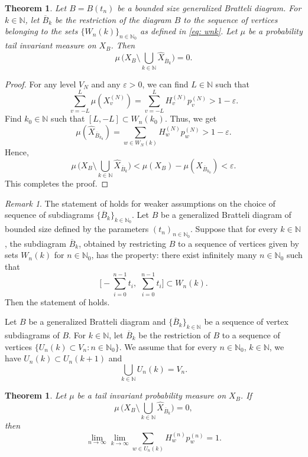 \documentclass[11pt,reqno]{amsart}
\theoremstyle{definition}
\theoremstyle{remark}
\newtheorem{remark}[definition]{Remark}
\theoremstyle{plain}
\newtheorem{theorem}[definition]{Theorem}
\def\ol{\overline}
\def\ov{\overline}
\def\wh{\widehat}
\newcommand{\N}{\mathbb N}
\numberwithin{equation}{section}
\begin{document}
\begin{theorem}\label{thm: muX_B_k} Let $B= B(t_n)$ be a bounded size generalized Bratteli diagram. For $k\in \N$, let $\ov{B}_k$ be the restriction of the diagram $B$ to the sequence of vertices belonging 
to the sets $\{W_n(k)\}_{n \in \N_0}$ as defined in \eqref{eq: wnk}. Let $\mu$ be a probability tail invariant measure on $X_B$. Then
 \[
 \mu \, \big(X_B \setminus \underset{k \in \N}{\bigcup} \wh{X}_{\ov{B}_k} \big) = 0.
\] 
 \end{theorem}

\begin{proof} 
For any level $V_N$ and any $\varepsilon> 0$, we can find $L\in \N$ such that 
 \[
 \sum_{v=-L}^{L} \mu(X_v^{(N)}) = \sum_{v=-L}^{L} H_v^{(N)}p_v^{(N)} > 1-\varepsilon.
 \] Find $k_0 \in \N$ such that $[L,-L] \subset W_n(k_0)$. Thus, we get
\[
\mu(\wh{X}_{\ov{B}_{k_0}}) = \underset{w \in W_N(k)}{\sum} H_w^{(N)}p_w^{(N)}  > 1-\varepsilon.
\]
Hence, 
\[
\mu \, \big(X_B \setminus \underset{k \in \N}{\bigcup} \wh{X}_{\ov{B}_k} \big) < \mu (X_B)  - \mu(\wh{X}_{\ov{B}_{k_0}})  < \varepsilon. 
\] 
This completes the proof.
\end{proof}

\begin{remark} The statement of  holds for weaker assumptions on the choice of sequence of subdiagrams $\{\ov{B}_k\}_{k \in \N_0}$. Let $B$ be a generalized Bratteli diagram of bounded size defined by the parameters $(t_n)_{n\in \N_0}$. Suppose that for every $k \in \N$, 
the subdiagram $\ol B_k$, 
obtained by restricting $B$ to a sequence of vertices given by sets $W_n(k)$ for $n \in \N_0$, 
has the property: there exist infinitely many $n\in \N_0$ such that 
\[
 \bigg[-\sum_{i=0}^{n-1} t_i,\,\, \sum_{i=0}^{n-1} t_i\bigg] \subset  W_n(k). 
\] 
Then the statement of  holds.
    
\end{remark}


Let $B$ be a generalized Bratteli diagram and $\{\ov{B}_k\}_{k \in \N}$ be a sequence of vertex subdiagrams of $B$. For $k \in \N$, let $\ov{B}_k$ be the restriction of $B$ to a sequence of vertices $\{U_n(k) \subset V_n : n \in \N_0\}$. We assume that for every $n \in \N_0$, $k \in \N$, we have $U_n(k) \subset U_n(k+1)$ and 
$$
\underset{k\in \N}{\bigcup} U_n(k) = V_n.
$$ 

\begin{theorem} 
Let $\mu$ be a tail invariant probability measure on $X_B$. If  
\[
\mu \, \big(X_B \setminus \underset{k \in \N}{\bigcup} \wh{X}_{\ov{B}_k} \big) = 0,
\]
then
\begin{equation}\label{H_w,p_w_limit}
\lim_{n\to \infty} \lim_{k\to \infty}
   \sum_{w \in U_n(k)} H_w^{(n)}p_w^{(n)}  = 1.
\end{equation}
\end{theorem}
\end{document}
